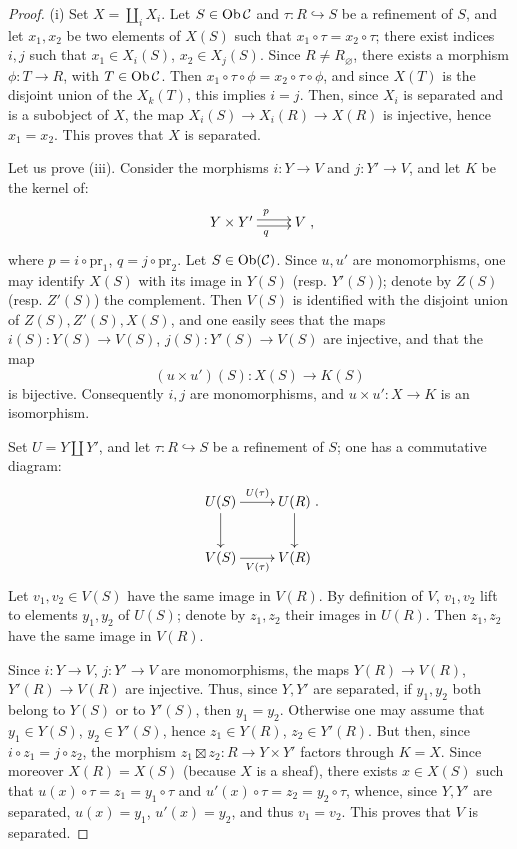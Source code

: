 \begin{proof}
(i) Set \(X=\coprod_i X_i\). Let \(S\in\operatorname{Ob}\mathcal C\) and
\(\tau:R\hookrightarrow S\) be a refinement of \(S\), and let
\(x_1,x_2\) be two elements of \(X(S)\) such that
\(x_1\circ\tau=x_2\circ\tau\); there exist indices \(i,j\) such that
\(x_1\in X_i(S)\), \(x_2\in X_j(S)\).
Since \(R\ne R_\varnothing\), there exists a morphism
\(\phi:T\to R\), with \(T\in\operatorname{Ob}\mathcal C\).
Then \(x_1\circ\tau\circ\phi=x_2\circ\tau\circ\phi\), and since
\(X(T)\) is the disjoint union of the \(X_k(T)\), this implies \(i=j\).
Then, since \(X_i\) is separated and is a subobject of \(X\), the
map \(X_i(S)\to X_i(R)\to X(R)\) is injective, hence \(x_1=x_2\).
This proves that \(X\) is separated.

Let us prove (iii). Consider the morphisms \(i:Y\to V\) and
\(j:Y'\to V\), and let \(K\) be the kernel of:
\[
\xymatrix{Y\times Y'\ar@<.5ex>[r]^p\ar@<-.5ex>[r]_q & V },
\]
where \(p=i\circ\mathrm{pr}_1\), \(q=j\circ\mathrm{pr}_2\).
Let \(S\in\operatorname{Ob}(\mathcal C)\).
Since \(u,u'\) are monomorphisms, one may identify \(X(S)\) with
its image in \(Y(S)\) (resp. \(Y'(S)\)); denote by \(Z(S)\)
(resp. \(Z'(S)\)) the complement.
Then \(V(S)\) is identified with the disjoint union of
\(Z(S),Z'(S),X(S)\), and one easily sees that the maps
\(i(S):Y(S)\to V(S)\), \(j(S):Y'(S)\to V(S)\) are injective,
and that the map
\[
(u\times u')(S):X(S)\longrightarrow K(S)
\]
is bijective. Consequently \(i,j\) are monomorphisms, and
\(u\times u':X\to K\) is an isomorphism.

Set \(U=Y\amalg Y'\), and let \(\tau:R\hookrightarrow S\) be
a refinement of \(S\); one has a commutative diagram:
\[
\xymatrix{U(S)\ar[r]^{U(\tau)}\ar[d] & U(R)\ar[d]\\
V(S)\ar[r]_{V(\tau)} & V(R) }.
\]
Let \(v_1,v_2\in V(S)\) have the same image in \(V(R)\).
By definition of \(V\), \(v_1,v_2\) lift to elements \(y_1,y_2\)
of \(U(S)\); denote by \(z_1,z_2\) their images in \(U(R)\).
Then \(z_1,z_2\) have the same image in \(V(R)\).

Since \(i:Y\to V\), \(j:Y'\to V\) are monomorphisms, the maps
\(Y(R)\to V(R)\), \(Y'(R)\to V(R)\) are injective.
Thus, since \(Y,Y'\) are separated, if \(y_1,y_2\) both belong to
\(Y(S)\) or to \(Y'(S)\), then \(y_1=y_2\).
Otherwise one may assume that \(y_1\in Y(S)\), \(y_2\in Y'(S)\),
hence \(z_1\in Y(R)\), \(z_2\in Y'(R)\).
But then, since \(i\circ z_1=j\circ z_2\), the morphism
\(z_1\boxtimes z_2:R\to Y\times Y'\) factors through \(K=X\).
Since moreover \(X(R)=X(S)\) (because \(X\) is a sheaf), there
exists \(x\in X(S)\) such that
\(u(x)\circ\tau=z_1=y_1\circ\tau\) and
\(u'(x)\circ\tau=z_2=y_2\circ\tau\), whence, since \(Y,Y'\)
are separated, \(u(x)=y_1\), \(u'(x)=y_2\), and thus \(v_1=v_2\).
This proves that \(V\) is separated.


\end{proof}
